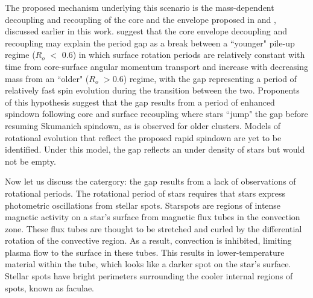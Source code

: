 The proposed mechanism underlying this scenario is the mass-dependent decoupling and recoupling of the core and the envelope proposed in 
\citet{lanzafame_rotational_2015} and \citet{spada_competing_2020}, discussed earlier in this work.
\citet{angus_exploring_2020} suggest that the core envelope decoupling and recoupling may explain the period gap as a break between a ``younger" pile-up regime ($R_o$ $<$ 0.6) in which surface rotation periods are relatively constant with time from core-surface angular momentum transport and increase with decreasing mass from an ``older" ($R_o$ $>$0.6) regime, with the gap representing a period of relatively fast spin evolution during the transition between the two.
Proponents of this hypothesis suggest that the gap results from a period of enhanced spindown following core and surface recoupling where stars ``jump" the gap before resuming Skumanich spindown, as is observed for older clusters.
Models of rotational evolution  that reflect the proposed rapid spindown are yet to be identified.
Under this model, the gap reflects an under density of stars but would not be empty.

Now let us discuss the  catergory: the gap results from a lack of observations of rotational periods.
The rotational period of \kepler{} stars requires that stars express photometric oscillations from stellar spots.
Starspots are regions of intense magnetic activity on a star's surface from magnetic flux tubes in the convection zone. 
These flux tubes are thought to be stretched and curled by the differential rotation of the convective region. 
As a result, convection is inhibited, limiting plasma flow to the surface in these tubes.
This results in lower-temperature material within the tube, which looks like a darker spot on the star's surface.
Stellar spots have bright perimeters surrounding the cooler internal regions of spots, known as faculae.

